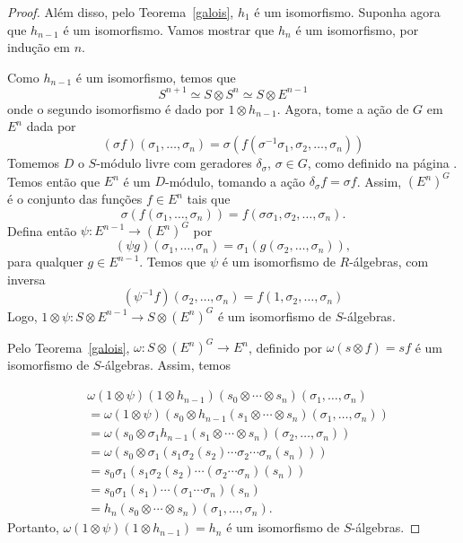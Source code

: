 \begin{lemma}
\begin{proof}
Além disso, pelo Teorema~\ref{galois}, $h_1$ é um isomorfismo. Suponha agora que $h_{n-1}$ é um isomorfismo. Vamos mostrar que $h_n$ é um isomorfismo, por indução em $n$. \par
Como $h_{n-1}$ é um isomorfismo, temos que
\[S^{n+1}\simeq S \otimes S^{n} \simeq S\otimes E^{n-1}\]onde o segundo isomorfismo é dado por $1\otimes h_{n-1}$. Agora, tome a ação de $G$ em $E^n$ dada por\[(\sigma f)(\sigma_1,\dots,\sigma_n) = \sigma\left( f(\sigma^{-1}\sigma_1,\sigma_2,\dots,\sigma_n) \right)\]
Tomemos $D$ o $S$-módulo livre com geradores $\delta_\sigma$, $\sigma \in G$, como definido na página \pageref{alg:D}. Temos então que $E^n$ é um $D$-módulo, tomando a ação $\delta_\sigma f = \sigma f$. Assim, $\left(E^n\right)^G$ é o conjunto das funções $f \in E^n$ tais que\[\sigma(f(\sigma_1,\dots,\sigma_n)) = f(\sigma\sigma_1,\sigma_2,\dots,\sigma_n).\]
Defina então $\psi: E^{n-1}\rightarrow (E^n)^G$ por\[(\psi g)(\sigma_1,\dots,\sigma_n) = \sigma_1(g(\sigma_2,\dots,\sigma_n)),\]
para qualquer $g\in E^{n-1}$. Temos que $\psi$ é um isomorfismo de $R$-álgebras, com inversa
\[(\psi^{-1}f)(\sigma_2,\dots,\sigma_n)= f(1,\sigma_2, \dots, \sigma_n)\]
Logo, $1\otimes \psi : S\otimes E^{n-1} \rightarrow S\otimes (E^n)^G$ é um isomorfismo de $S$-álgebras. \par 
Pelo Teorema~\ref{galois}, $\omega: S\otimes(E^n)^G \rightarrow E^n$, definido por $\omega(s\otimes f) = sf$ é um isomorfismo de $S$-álgebras. Assim, temos

\begin{align*}
    & \omega(1\otimes \psi)(1\otimes h_{n-1})(s_0 \otimes \cdots \otimes s_n)(\sigma_1,\dots,\sigma_n) \\
    & = \omega(1\otimes \psi)(s_0 \otimes h_{n-1}(s_1\otimes \cdots \otimes s_n)(\sigma_1,\dots,\sigma_n)) \\
    & =  \omega \left(s_0 \otimes \sigma_1h_{n-1}(s_1\otimes\cdots\otimes s_n)(\sigma_2,\dots,\sigma_n) \right) \\
    & = \omega\left(s_0\otimes \sigma_1 \left(s_1 \sigma_2(s_2)\cdots \sigma_2\cdots \sigma_n(s_n) \right) \right) \\
    & =  s_0 \sigma_1 \left(s_1 \sigma_2(s_2)\cdots (\sigma_2\cdots \sigma_n)(s_n) \right) \\
    & =  s_0 \sigma_1 (s_1) \cdots (\sigma_1 \cdots \sigma_n) (s_n) \\
    & =  h_n (s_0 \otimes \cdots \otimes s_n)(\sigma_1, \dots, \sigma_n).
\end{align*}
Portanto, $\omega(1\otimes \psi)(1\otimes h_{n-1})=h_n$ é um isomorfismo de $S$-álgebras.
\end{proof}
\end{lemma}

